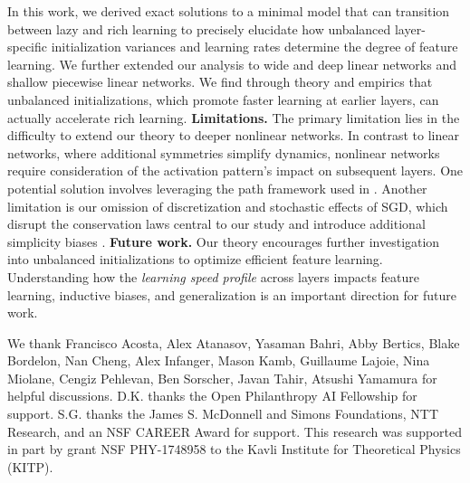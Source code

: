 \documentclass{article}
\theoremstyle{plain}
\theoremstyle{definition}
\theoremstyle{remark}
\begin{document}
In this work, we derived exact solutions to a minimal model that can transition between lazy and rich learning to precisely elucidate how unbalanced layer-specific initialization variances and learning rates determine the degree of feature learning.
%
We further extended our analysis to wide and deep linear networks and shallow piecewise linear networks.
%
We find through theory and empirics that unbalanced initializations, which promote faster learning at earlier layers, can actually accelerate rich learning.
%
\textbf{Limitations.}
%
The primary limitation lies in the difficulty to extend our theory to deeper nonlinear networks. 
%
In contrast to linear networks, where additional symmetries simplify dynamics, nonlinear networks require consideration of the activation pattern's impact on subsequent layers. 
%
One potential solution involves leveraging the path framework used in \citet{saxe2022neural}.
%
Another limitation is our omission of discretization and stochastic effects of SGD, which disrupt the conservation laws central to our study and introduce additional simplicity biases \cite{kunin2020neural, tanaka2021noether, chen2024stochastic, ziyin2024implicit}. 
%
\textbf{Future work.}
%
Our theory encourages further investigation into unbalanced initializations to optimize efficient feature learning. 
%
%
Understanding how the \emph{learning speed profile} across layers impacts feature learning, inductive biases, and generalization is an important direction for future work.









\clearpage
\begin{ack}
    We thank Francisco Acosta, Alex Atanasov, Yasaman Bahri, Abby Bertics, Blake Bordelon, Nan Cheng, Alex Infanger, Mason Kamb, Guillaume Lajoie, Nina Miolane, Cengiz Pehlevan, Ben Sorscher, Javan Tahir, Atsushi Yamamura for helpful discussions.
    D.K. thanks the Open Philanthropy AI Fellowship for support.
    S.G. thanks the James S. McDonnell and Simons Foundations, NTT Research, and an NSF CAREER Award for support.
    This research was supported in part by grant NSF PHY-1748958 to the Kavli Institute for Theoretical Physics (KITP).
\end{ack}
\end{document}
